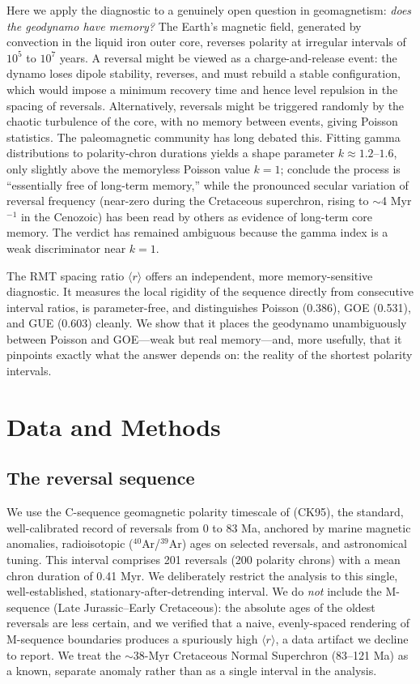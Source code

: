 \documentclass[12pt,a4paper]{article}
\begin{document}
Here we apply the diagnostic to a genuinely open question in geomagnetism: \emph{does the geodynamo have memory?} The Earth's magnetic field, generated by convection in the liquid iron outer core, reverses polarity at irregular intervals of $10^5$ to $10^7$ years. A reversal might be viewed as a charge-and-release event: the dynamo loses dipole stability, reverses, and must rebuild a stable configuration, which would impose a minimum recovery time and hence level repulsion in the spacing of reversals. Alternatively, reversals might be triggered randomly by the chaotic turbulence of the core, with no memory between events, giving Poisson statistics. The paleomagnetic community has long debated this. Fitting gamma distributions to polarity-chron durations yields a shape parameter $k\approx1.2$--$1.6$, only slightly above the memoryless Poisson value $k=1$; \citet{lowrie2004} conclude the process is ``essentially free of long-term memory,'' while the pronounced secular variation of reversal frequency (near-zero during the Cretaceous superchron, rising to $\sim$4 Myr$^{-1}$ in the Cenozoic) has been read by others as evidence of long-term core memory. The verdict has remained ambiguous because the gamma index is a weak discriminator near $k=1$.

The RMT spacing ratio $\langle r\rangle$ offers an independent, more memory-sensitive diagnostic. It measures the local rigidity of the sequence directly from consecutive interval ratios, is parameter-free, and distinguishes Poisson (0.386), GOE (0.531), and GUE (0.603) cleanly. We show that it places the geodynamo unambiguously between Poisson and GOE---weak but real memory---and, more usefully, that it pinpoints exactly what the answer depends on: the reality of the shortest polarity intervals.

\section{Data and Methods}

\subsection{The reversal sequence}

We use the C-sequence geomagnetic polarity timescale of \citet{candekent1995} (CK95), the standard, well-calibrated record of reversals from 0 to 83 Ma, anchored by marine magnetic anomalies, radioisotopic ($^{40}$Ar/$^{39}$Ar) ages on selected reversals, and astronomical tuning. This interval comprises 201 reversals (200 polarity chrons) with a mean chron duration of 0.41 Myr. We deliberately restrict the analysis to this single, well-established, stationary-after-detrending interval. We do \emph{not} include the M-sequence (Late Jurassic--Early Cretaceous): the absolute ages of the oldest reversals are less certain, and we verified that a naive, evenly-spaced rendering of M-sequence boundaries produces a spuriously high $\langle r\rangle$, a data artifact we decline to report. We treat the $\sim$38-Myr Cretaceous Normal Superchron (83--121 Ma) as a known, separate anomaly rather than as a single interval in the analysis.
\end{document}
